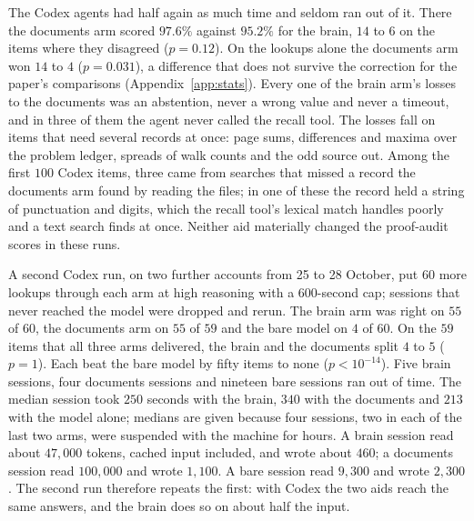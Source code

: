The Codex agents had half again as much time and seldom ran out of it. There the documents arm scored $97.6\%$ against $95.2\%$ for the brain, $14$ to $6$ on the items where they disagreed ($p=0.12$). On the lookups alone the documents arm won $14$ to $4$ ($p=0.031$), a difference that does not survive the correction for the paper's comparisons (Appendix~\ref{app:stats}). Every one of the brain arm's losses to the documents was an abstention, never a wrong value and never a timeout, and in three of them the agent never called the recall tool. The losses fall on items that need several records at once: page sums, differences and maxima over the problem ledger, spreads of walk counts and the odd source out. Among the first $100$ Codex items, three came from searches that missed a record the documents arm found by reading the files; in one of these the record held a string of punctuation and digits, which the recall tool's lexical match handles poorly and a text search finds at once. Neither aid materially changed the proof-audit scores in these runs.

A second Codex run, on two further accounts from 25 to 28 October, put $60$ more lookups through each arm at high reasoning with a $600$-second cap; sessions that never reached the model were dropped and rerun. The brain arm was right on $55$ of $60$, the documents arm on $55$ of $59$ and the bare model on $4$ of $60$. On the $59$ items that all three arms delivered, the brain and the documents split $4$ to $5$ ($p=1$). Each beat the bare model by fifty items to none ($p<10^{-14}$). Five brain sessions, four documents sessions and nineteen bare sessions ran out of time. The median session took $250$ seconds with the brain, $340$ with the documents and $213$ with the model alone; medians are given because four sessions, two in each of the last two arms, were suspended with the machine for hours. A brain session read about $47{,}000$ tokens, cached input included, and wrote about $460$; a documents session read $100{,}000$ and wrote $1{,}100$. A bare session read $9{,}300$ and wrote $2{,}300$. The second run therefore repeats the first: with Codex the two aids reach the same answers, and the brain does so on about half the input.

